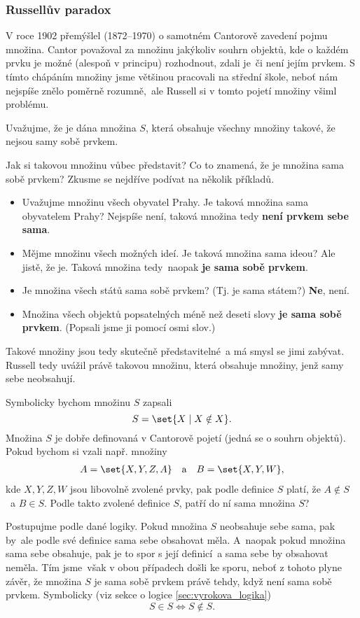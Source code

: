 \subsubsection{Russellův paradox}
V roce 1902 přemýšlel  (1872--1970) o samotném Cantorově zavedení pojmu množina. Cantor považoval za množinu jakýkoliv souhrn objektů, kde o každém prvku je možné (alespoň v principu) rozhodnout, zdali je~či není jejím prvkem. S tímto chápáním množiny jsme většinou pracovali na střední škole, neboť nám nejspíše znělo poměrně rozumně,~ale Russell si v tomto pojetí množiny všiml problému.\par
Uvažujme, že je dána množina $S$, která obsahuje všechny množiny takové, že nejsou samy sobě prvkem.\par
Jak si takovou množinu vůbec představit? Co to znamená, že je množina sama sobě prvkem? Zkusme se nejdříve podívat na několik příkladů.
\begin{itemize}
    \item Uvažujme množinu všech obyvatel Prahy. Je taková množina sama obyvatelem Prahy? Nejspíše není, taková množina tedy \textbf{není prvkem sebe sama}.
    \item Mějme množinu všech možných ideí. Je taková množina sama ideou? Ale jistě, že je. Taková množina tedy~naopak \textbf{je sama sobě prvkem}.
    \item Je množina všech států sama sobě prvkem? (Tj. je sama státem?) \textbf{Ne}, není.
    \item Množina všech objektů popsatelných méně než deseti slovy \textbf{je sama sobě prvkem}. (Popsali jsme ji pomocí osmi slov.)
\end{itemize}
Takové množiny jsou tedy skutečně představitelné~a má smysl se jimi zabývat. Russell tedy uvážil právě takovou množinu, která obsahuje množiny, jenž samy sebe neobsahují.

Symbolicky bychom množinu $S$ zapsali
\begin{equation*}
S=\set{X \mid X \notin X}.
\end{equation*}
Množina $S$ je dobře definovaná v Cantorově pojetí (jedná se o souhrn objektů). Pokud bychom si vzali např. množiny
\begin{align*}
A=\set{X,Y,Z,A} \quad \text{a} \quad B=\set{X,Y,W},
\end{align*}
kde $X,Y,Z,W$ jsou libovolně zvolené prvky, pak podle definice $S$ platí, že $A \notin S$~a $B \in S$. Podle takto zvolené definice $S$, patří do ní sama množina $S$?\par
Postupujme podle dané logiky. Pokud množina $S$ neobsahuje sebe sama, pak by~ale podle své definice sama sebe obsahovat měla. A~naopak pokud množina sama sebe obsahuje, pak je to spor s její definicí~a sama sebe by obsahovat neměla. Tím jsme~však v obou případech došli ke sporu, neboť z tohoto plyne závěr, že množina $S$ je sama sobě prvkem právě tehdy, když není sama sobě prvkem. Symbolicky (viz sekce o logice \ref{sec:vyrokova_logika})
\begin{equation*}
S \in S \iff S \notin S.
\end{equation*}

